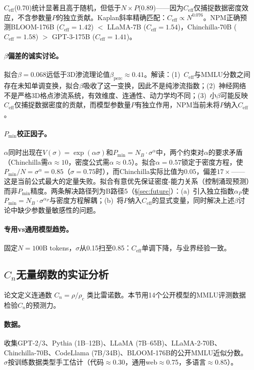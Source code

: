 \documentclass[11pt,a4paper]{article}
\newcommand{\Ceff}{C_{\text{eff}}}
\newcommand{\rhoc}{\rho_c}
\begin{document}
$\Ceff$(0.70)统计显著且高于随机，但低于$N{\times}P$(0.89)——因为$\Ceff$仅捕捉数据密度效应，不含参数量$P$的独立贡献。Kaplan斜率精确匹配：$\Ceff\propto N^{0.076}$。NPM正确预测BLOOM-176B ($\Ceff=1.42$) $<$ LLaMA-7B ($\Ceff=1.54$)，Chinchilla-70B ($\Ceff=1.58$) $>$ GPT-3-175B ($\Ceff=1.41$)。

\paragraph{$\beta$偏差的诚实讨论。}
拟合$\beta=0.068$远低于3D渗流理论值$\beta_{\text{perc}}\approx0.41$。解读：(1)~$\Ceff$与MMLU分数之间存在未知单调变换，拟合$\beta$吸收了这一变换，因此不是纯渗流指数；(2)~神经网络不是严格3D格点渗流系统，有效维度、连通性、动力学均不同；(3)~小$\beta$可能反映$\Ceff$仅捕捉数据密度的贡献，而模型参数量$P$有独立作用，NPM当前未将$P$纳入$\Ceff$。

\paragraph{$P_{\min}$校正因子。}
$\alpha$同时出现在$V(\sigma)=\exp(\alpha\sigma)$和$P_{\min}=N_B\cdot\sigma^\alpha$中，两个约束对$\alpha$的要求矛盾（Chinchilla需$\alpha\approx10$，密度公式需$\alpha\approx0.5$）。拟合$\alpha=0.57$锁定于密度方程，使$P_{\min}/N=\sigma^\alpha=0.85$（$\sigma=0.75$时），而Chinchilla实际比值为$0.05$，偏差$17\times$——这是当前公式最大的定量失败。拟合有意优先保证密度-能力关系（控制涌现预测）而非$P_{\min}$精度。两条解决路径列为B路径5（\S\ref{sec:future}）：(a)~引入独立指数$\alpha_P$使$P_{\min}=N_B\cdot\sigma^{\alpha_P}$与密度方程解耦；(b)~将$P$纳入$\Ceff$的显式变量，同时解决上述$\beta$讨论中缺少参数量敏感性的问题。

\paragraph{专用vs通用模型趋势。}
固定$N=100$B tokens，$\sigma$从0.15扫至0.85：$\Ceff$单调下降，与业界经验一致。

\subsection{$C_n$无量纲数的实证分析}
\label{sec:cn-empirical}

论文定义连通数 $C_n=\rho/\rhoc$ 类比雷诺数。本节用14个公开模型的MMLU评测数据检验$C_n$的预测力。

\paragraph{数据。}
收集GPT-2/3、Pythia (1B–12B)、LLaMA (7B–65B)、LLaMA-2-70B、Chinchilla-70B、CodeLlama (7B/34B)、BLOOM-176B的公开MMLU近似分数。$\sigma$按训练数据类型手工估计（代码$\approx$0.30，通用web$\approx$0.75，多语言$\approx$0.85）。
\end{document}
